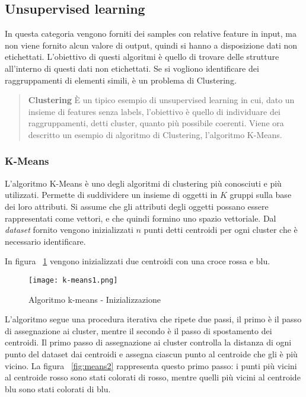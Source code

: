 \documentclass[../main.tex]{subfiles}
\begin{document}
\subsection{Unsupervised learning}
In questa categoria vengono forniti dei samples con relative feature in input, ma non viene fornito alcun valore di output, quindi si hanno a disposizione dati non etichettati. L'obiettivo di questi algoritmi è quello di trovare delle strutture all'interno di questi dati non etichettati. Se si vogliono identificare dei raggruppamenti di elementi simili, è un problema di Clustering.


\begin{verse}
				\textbf{Clustering} È un tipico esempio di unsupervised learning in cui, dato un insieme di features senza labels, l'obiettivo è quello di individuare dei raggruppamenti, detti cluster, quanto più possibile coerenti. Viene ora descritto un esempio di algoritmo di Clustering, l'algoritmo K-Means.
\end{verse}	

\subsubsection{K-Means}
L'algoritmo K-Means è uno degli algoritmi di clustering più conosciuti e più utilizzati. Permette di suddividere un insieme di oggetti in $K$ gruppi sulla base dei loro attributi.
Si assume che gli attributi degli oggetti possano essere rappresentati come vettori, e che quindi formino uno spazio vettoriale. Dal \textit{dataset} fornito vengono inizializzati $n$ punti detti centroidi per ogni cluster che è necessario identificare.

In figura ~\ref{fig:means1} vengono inizializzati due centroidi con una croce rossa e blu.

\begin{figure}[H]
				\centering
				\texttt{[image: k-means1.png]}
				\caption{Algoritmo k-means - Inizializzazione}
				\label{fig:means1}
\end{figure}

L'algoritmo segue una procedura iterativa che ripete due passi, il primo è il passo di assegnazione ai cluster, mentre il secondo è il passo di spostamento dei centroidi.
Il primo passo di assegnazione ai cluster controlla la distanza di ogni punto del dataset dai centroidi e assegna ciascun punto al centroide che gli è più vicino. 
La figura ~\ref{fig:means2} rappresenta questo primo passo: i punti più vicini al centroide rosso sono stati colorati di rosso, mentre quelli più vicini al centroide blu sono stati colorati di blu.
\end{document}

